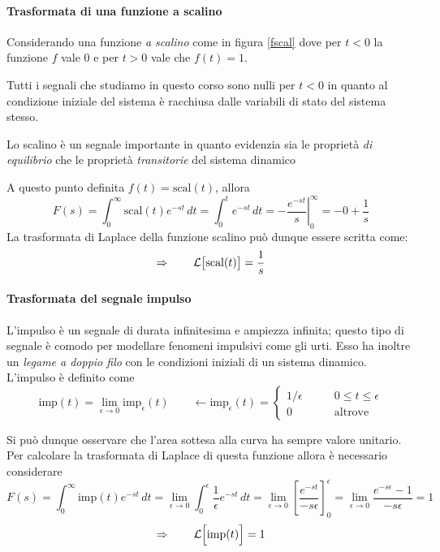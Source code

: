 	\paragraph{Trasformata di una funzione a scalino} Considerando una funzione \textit{ a scalino} come in figura \ref{fscal} dove per $t<0$ la funzione $f$ vale 0 e per $t>0$ vale che $f(t)=1$.
	
	
	\begin{nota}
		Tutti i segnali che studiamo in questo corso sono nulli per $t<0$ in quanto al condizione iniziale del sistema è racchiusa dalle variabili di stato del sistema stesso.
	\end{nota}
	\begin{nota}
		Lo scalino è un segnale importante in quanto evidenzia sia le proprietà \textit{ di equilibrio} che le proprietà \textit{transitorie} del sistema dinamico
	\end{nota}

	A questo punto definita $f(t) = \textrm{scal}(t)$, allora
	\[F(s) = \int_0^\infty \textrm{scal}(t) e^{-st} \, dt = \int_0 ^t e^{-st}\, dt = - \left.\frac{e^{-st}}{s}\right|_0^\infty = - 0 + \frac 1 s \]
	La trasformata di Laplace della funzione scalino può dunque essere scritta come:
	\begin{equation}
		\Rightarrow \qquad \mathcal L \big[\textrm{scal}(t)\big] = \frac 1 s
	\end{equation}
	
	\paragraph{Trasformata del segnale impulso} L'impulso è un segnale di durata infinitesima e ampiezza infinita; questo tipo di segnale è comodo per modellare fenomeni impulsivi come gli urti. Esso ha inoltre un \textit{legame a doppio filo} con le condizioni iniziali di un sistema dinamico. \\	
	L'impulso è definito come
	\[\textrm{imp}(t) = \lim_{\epsilon \rightarrow 0} \textrm{imp}_\epsilon(t) \qquad \leftarrow \textrm{imp}_\epsilon(t) = \begin{cases}
		1/\epsilon \qquad & 0 \leq t \leq \epsilon \\ 0 & \textrm{altrove}
	\end{cases}\]
	

	Si può dunque osservare che l'area sottesa alla curva ha sempre valore unitario. Per calcolare la trasformata di Laplace di questa funzione allora è necessario considerare
	\[F(s)=\int_0^\infty \textrm{imp}(t) e^{-st}\, dt = \lim_{\epsilon\rightarrow 0} \int_0^\epsilon \frac 1 \epsilon e^{-st}\, dt = \lim_{\epsilon\rightarrow 0} \left[\frac{e^{-st}}{-s\epsilon}\right]_0^\epsilon = \lim_{\epsilon\rightarrow 0} \frac{e^{-s\epsilon} - 1 }{-s\epsilon} = 1  \]
	\begin{equation}
		\Rightarrow \qquad	\mathcal L\Big[ \textrm{imp}(t)\Big] = 1
	\end{equation}
	
